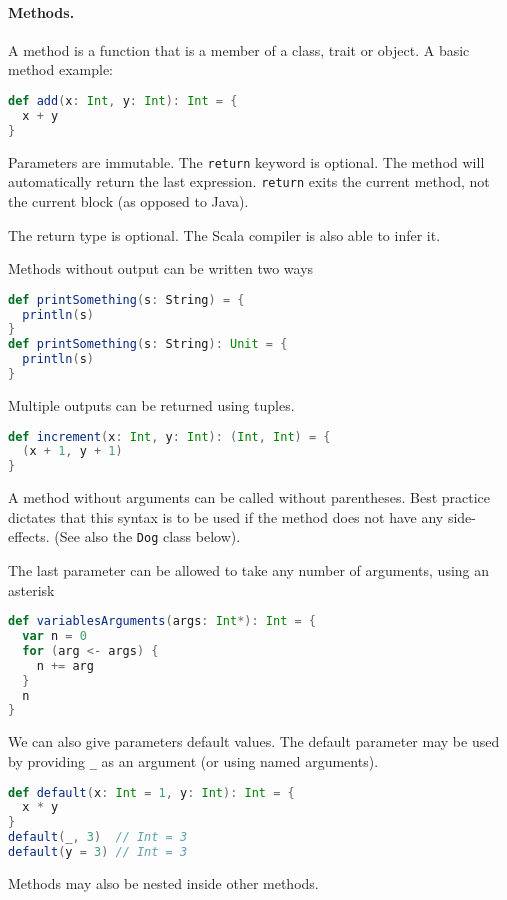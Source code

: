 \paragraph{Methods.}
A method is a function that is a member of a class, trait or object.
A basic method example:
\begin{lstlisting}[language=scala, style=snippet]
def add(x: Int, y: Int): Int = {
  x + y
}
\end{lstlisting}
Parameters are immutable. The \texttt{return} keyword is optional. The method will automatically return the last expression. \texttt{return} exits the current method, not the current block (as opposed to Java).
 
The return type is optional. The Scala compiler is also able to infer it.

Methods without output can be written two ways
\begin{lstlisting}[language=scala, style=snippet]
def printSomething(s: String) = {
  println(s)
}
def printSomething(s: String): Unit = {
  println(s)
}
\end{lstlisting}
Multiple outputs can be returned using tuples.
\begin{lstlisting}[language=scala, style=snippet]
def increment(x: Int, y: Int): (Int, Int) = {
  (x + 1, y + 1)
}
\end{lstlisting}
A method without arguments can be called without parentheses. Best practice dictates that this syntax is to be used if the method does not have any side-effects. (See also the \texttt{Dog} class below).

The last parameter can be allowed to take any number of arguments, using an asterisk
\begin{lstlisting}[language=scala, style=snippet]
def variablesArguments(args: Int*): Int = {
  var n = 0
  for (arg <- args) {
    n += arg
  }
  n
}
\end{lstlisting}
We can also give parameters default values. The default parameter may be used by providing \texttt{\_} as an argument (or using named arguments).
\begin{lstlisting}[language=scala, style=snippet]
def default(x: Int = 1, y: Int): Int = {
  x * y
}
default(_, 3)  // Int = 3
default(y = 3) // Int = 3
\end{lstlisting}

Methods may also be nested inside other methods.

